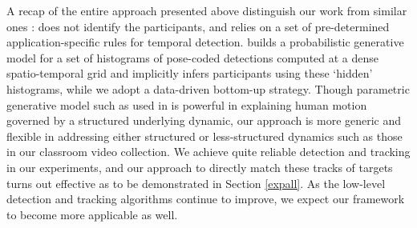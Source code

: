 A recap of the entire approach presented above distinguish our work from similar ones \cite{Ryoo:group,Amer:group}: \cite{Ryoo:group} does not identify the participants, and relies on a set of pre-determined application-specific rules for temporal detection. \cite{Amer:group} builds a probabilistic generative model for a set of histograms of pose-coded detections computed at a dense spatio-temporal grid and implicitly infers participants using these `hidden' histograms, while we adopt a data-driven bottom-up strategy. Though parametric generative model such as used in \cite{Ryoo:group} is powerful in explaining human motion governed by a structured underlying dynamic, our approach is more generic and flexible in addressing either structured or less-structured dynamics such as those in our classroom video collection. We achieve quite reliable detection and tracking in our experiments, and our approach to directly match these tracks of targets turns out effective as to be demonstrated in Section \ref{expall}. As the low-level detection and tracking algorithms continue to improve, we expect our framework to become more applicable as well.

